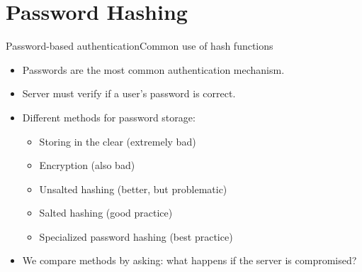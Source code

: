 \ifdefined\PRESENTATION\else\PassOptionsToClass{handout}{beamer}\fi\documentclass[aspectratio=169, lualatex]{beamer}
\begin{document}
\section{Password Hashing}

\begin{frame}{Password-based authentication}{Common use of hash functions}
	\begin{itemize}
		\item Passwords are the most common authentication mechanism.
		\item Server must verify if a user's password is correct.
		\item Different methods for password storage:
		      \begin{itemize}
			      \item<1-5> Storing in the clear (extremely bad)
			      \item<2-5> Encryption (also bad)
			      \item<3-5> Unsalted hashing (better, but problematic)
			      \item<4-5> Salted hashing (good practice)
			      \item<5-5> Specialized password hashing (best practice)
		      \end{itemize}
		\item We compare methods by asking: what happens if the server is compromised?
	\end{itemize}
\end{frame}
\end{document}
